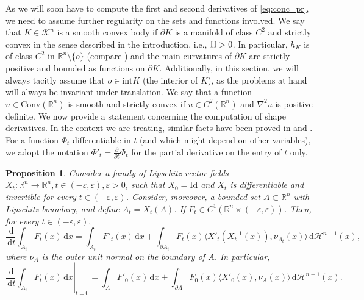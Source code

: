 \documentclass[a4paper, 11pt]{article}
\newcommand{\R}{\mathbb{R}}
\newcommand{\K}{\mathcal{K}}
\newcommand{\haus}{\mathcal{H}}
\newcommand{\Id}{\mathrm{Id}}
\newtheorem{proposition}[theorem]{Proposition}
\theoremstyle{definition}
\newcommand{\Conv}{\mathrm{Conv}}
\newcommand{\di}{\, \mathrm{d}}
\begin{document}
As we will soon have to compute the first and second derivatives of \eqref{eq:conc_pr}, we need to assume further regularity on the sets and functions involved. We say that $K \in \K^n$ is a smooth convex body if $\partial K$ is a manifold of class $C^2$ and strictly convex in the sense described in the introduction, i.e.,
${\rm II} > 0$. In particular, $h_K$ is of class $C^2$ in $\R^n \setminus \{ o\}$ (compare \cite[Section 2.5]{SchneiderConvexBodiesBrunn2013}) and the main curvatures of $\partial K$ are strictly positive and bounded as functions on $\partial K$. Additionally, in this section, we will always tacitly assume that $o \in \mathrm{int}K$ (the interior of $K$), as the problems at hand will always be invariant under translation. We say that a function $u \in \Conv(\R^n)$ is smooth and strictly convex if $u \in C^2(\R^n)$ and $\nabla^2 u$ is positive definite. We now provide a statement concerning the computation of shape derivatives. In the context we are treating, similar facts have been proved in \cite{Kol_Mil_P} and \cite{cordero2025concavity}. For a function $\Phi_t$ differentiable in $t$ (and which might depend on other variables), we adopt the notation $\Phi'_t=\frac{\partial }{\partial t} \Phi_t$ for the partial derivative on the entry of $t$ only.
\begin{proposition}\label{prop:derivative}
    Consider a family of Lipschitz vector fields $X_t: \R^n \to \R^n, t \in (-\varepsilon,\varepsilon), \varepsilon>0$, such that $X_0=\Id$ and $X_t$ is differentiable and invertible for every $t \in (-\varepsilon,\varepsilon)$. Consider, moreover, a bounded set $A \subset \R^n$ with Lipschitz boundary, and define $A_t=X_t(A)$. If $F_t \in C^1(\R^n\times(-\varepsilon,\varepsilon))$. Then, for every $t \in (-\varepsilon,\varepsilon),$
        \begin{equation}\label{eq:first_derivative}
            \frac{\di}{\di t} \int_{A_t} F_t(x) \di x =\int_{A_t} F'_t (x) \di x + \int_{\partial A_t}F_t(x) \langle X'_t(X^{-1}_t(x)), \nu_{A_t}(x) \rangle \di \haus^{n-1}(x), 
        \end{equation}
        where $\nu_A$ is the outer unit normal on the boundary of $A$. In particular,
        \begin{equation}\label{eq:first_derivative_0}
            \left.  \frac{\di}{\di t} \int_{A_t} F_t(x) \di x \right|_{t=0} =\int_{A} F'_0 (x) \di x + \int_{\partial A}F_0(x) \langle X'_0(x), \nu_{A}(x) \rangle \di \haus^{n-1}(x).
        \end{equation}
\end{proposition}
\end{document}
